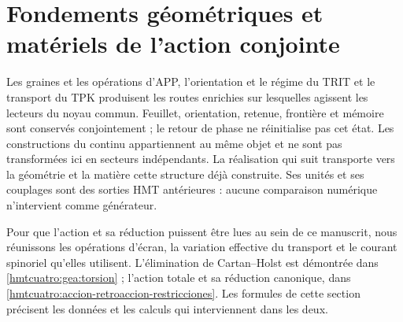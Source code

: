 \section{Fondements géométriques et matériels de l’action conjointe}
\label{hmtcuatro:ant:seccion}

Les graines et les opérations d’APP, l’orientation et le régime du TRIT et le transport du TPK produisent les routes enrichies sur lesquelles agissent les lecteurs du noyau commun. Feuillet, orientation, retenue, frontière et mémoire sont conservés conjointement ; le retour de phase ne réinitialise pas cet état. Les constructions du continu appartiennent au même objet et ne sont pas transformées ici en secteurs indépendants. La réalisation qui suit transporte vers la géométrie et la matière cette structure déjà construite. Ses unités et ses couplages sont des sorties HMT antérieures : aucune comparaison numérique n’intervient comme générateur.

Pour que l’action et sa réduction puissent être lues au sein de ce manuscrit, nous réunissons les opérations d’écran, la variation effective du transport et le courant spinoriel qu’elles utilisent. L’élimination de Cartan--Holst est démontrée dans \ref{hmtcuatro:gea:torsion} ; l’action totale et sa réduction canonique, dans \ref{hmtcuatro:accion-retroaccion-restricciones}. Les formules de cette section précisent les données et les calculs qui interviennent dans les deux.

